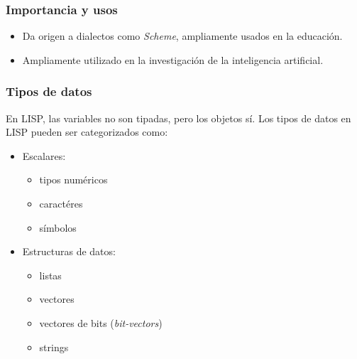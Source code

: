\documentclass{beamer}
\begin{document}

\begin{frame}
\frametitle{Importancia y usos}
\begin{itemize}
  \item Da origen a dialectos como \emph{Scheme}, ampliamente usados en la educaci\'on.
  \item Ampliamente utilizado en la investigaci\'on de la inteligencia artificial.
\end{itemize}

\end{frame}


\begin{frame}
\frametitle{Tipos de datos}
En LISP, las variables no son tipadas, pero los objetos s\'i.
Los tipos de datos en LISP pueden ser categorizados como:
\begin{itemize}
  \item Escalares:
  \begin{itemize}
    \item tipos num\'ericos
    \item caract\'eres
    \item s\'imbolos
  \end{itemize}
  \item Estructuras de datos:
  \begin{itemize}
    \item listas
    \item vectores
    \item vectores de bits (\emph{bit-vectors})
    \item strings
  \end{itemize}
\end{itemize}
\end{frame}

\end{document}
